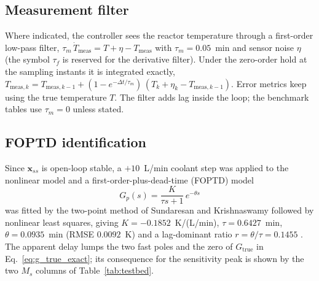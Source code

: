 \subsection{Measurement filter}
\label{subsec:meas_filter}
Where indicated, the controller sees the reactor temperature through a first-order low-pass filter, $\tau_m\,\dot T_{\text{meas}} = T + \eta - T_{\text{meas}}$ with $\tau_m = 0.05$~min and sensor noise $\eta$ (the symbol $\tau_f$ is reserved for the derivative filter). Under the zero-order hold at the sampling instants it is integrated exactly, $T_{\text{meas},k} = T_{\text{meas},k-1} + (1 - e^{-\Delta t/\tau_m})\,(T_k + \eta_k - T_{\text{meas},k-1})$. Error metrics keep using the true temperature $T$. The filter adds lag inside the loop; the benchmark tables use $\tau_m = 0$ unless stated.

\subsection{FOPTD identification}
\label{subsec:foptd_identification}
Since $\mathbf{x}_{ss}$ is open-loop stable, a $+10$~L/min coolant step was applied to the nonlinear model and a first-order-plus-dead-time (FOPTD) model
\begin{equation}
    G_p(s) = \frac{K}{\tau s + 1}\,e^{-\theta s}
    \label{eq:foptd}
\end{equation}
was fitted by the two-point method of Sundaresan and Krishnaswamy followed by nonlinear least squares, giving $K = -0.1852$~K/(L/min), $\tau = 0.6427$~min, $\theta = 0.0935$~min (RMSE $0.0092$~K) and a lag-dominant ratio $r = \theta/\tau = 0.1455$ \cite{shinskey1996process, odwyer2009handbook}. The apparent delay lumps the two fast poles and the zero of $G_{\text{true}}$ in Eq.~\eqref{eq:g_true_exact}; its consequence for the sensitivity peak is shown by the two $M_s$ columns of Table~\ref{tab:testbed}.

